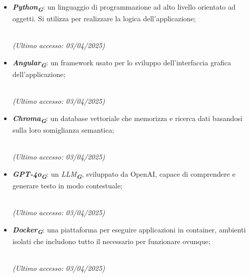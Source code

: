 \label{sec:tecnologie_utilizzate}

\begin{itemize}
    \item \textbf{\emph{Python}\textsubscript{\textit{\textbf{G}}}}: un linguaggio di programmazione ad alto livello orientato ad oggetti. Si
    utilizza per realizzare la logica dell’applicazione;
    \begin{center}
         \\
        \emph{(Ultimo accesso: 03/04/2025)}
    \end{center}

    \item \textbf{\emph{Angular}\textsubscript{\textit{\textbf{G}}}}: un framework usato per lo sviluppo dell’interfaccia grafica dell’applicazione;
    \begin{center}
         \\
        \emph{(Ultimo accesso: 03/04/2025)}
    \end{center}
    
    \item \textbf{\emph{Chroma}\textsubscript{\textit{\textbf{G}}}}: un database vettoriale che memorizza e ricerca dati basandosi sulla loro somiglianza semantica;
    \begin{center}
         \\
        \emph{(Ultimo accesso: 03/04/2025)}
    \end{center}

    \item \textbf{\emph{GPT-4o}\textsubscript{\textit{\textbf{G}}}}: un \emph{LLM}\textsubscript{\textit{\textbf{G}}}, sviluppato da OpenAI, capace di comprendere e generare testo in modo contestuale;
    \begin{center}
         \\
        \emph{(Ultimo accesso: 03/04/2025)}
    \end{center}

    \item \textbf{\emph{Docker}\textsubscript{\textit{\textbf{G}}}}: una piattaforma per eseguire applicazioni in container, ambienti isolati che includono tutto il necessario per funzionare ovunque;
    \begin{center}
         \\
        \emph{(Ultimo accesso: 03/04/2025)}
    \end{center}
    

\end{itemize}
